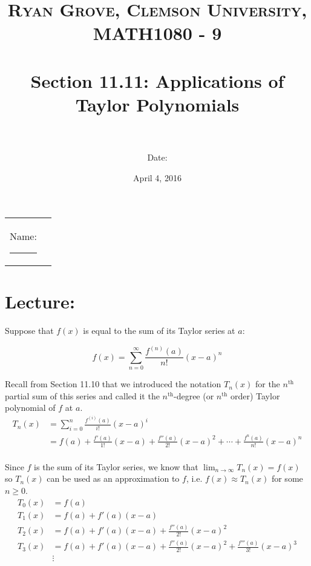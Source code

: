 \documentclass[paper=a4, fontsize=11pt]{scrartcl} %
\title{	
\normalfont \normalsize 
\textsc{Ryan Grove, Clemson University, MATH1080 - 9} \\ [25pt] %
\horrule{0.5pt} \\[0.4cm] %
\huge Section 11.11: Applications of Taylor Polynomials \\ %
\horrule{2pt} \\[0.5cm] %
}
\author{Date:} %
\date{\normalsize April 4, 2016} %
\numberwithin{equation}{section} %
\numberwithin{figure}{section} %
\numberwithin{table}{section} %
\newcommand{\ds}{\displaystyle}
\begin{document}
\maketitle %

\begin{flushleft}
\begin{tabular}{l l}
Name: \rule{3.2in}{.01cm}  & {}%
\end{tabular}
\end{flushleft}


\section*{\textbf{Lecture:}}

Suppose that $f(x)$ is equal to the sum of its Taylor series at $a$:

\[f(x) = \ds\sum_{n=0}^\infty \ds\frac{f^{(n)}(a)}{n!}(x-a)^n\]
\indent

Recall from Section 11.10 that we introduced the notation $T_n(x)$ for the $n^{\text{th}}$ partial sum of this series and called it the $n^{\text{th}}$-degree (or $n^{\text{th}}$ order) Taylor polynomial of $f$ at $a$.\\

\begin{align*}
T_n(x) &= \ds\sum_{i=0}^n \ds\frac{f^{(i)}(a)}{i!}(x-a)^i\\
&= f(a) + \ds\frac{f'(a)}{1!}(x-a) + \ds\frac{f''(a)}{2!}(x-a)^2 + \cdots + \ds\frac{f^{n}(a)}{n!} (x-a)^n\\
\end{align*}

Since $f$ is the sum of its Taylor series, we know that $\ds\lim_{n\to\infty} T_n(x)=f(x)$ so $T_n(x)$ can be used as an approximation to $f$, i.e. $f(x) \approx T_n(x)$ for some $n\geq 0$.\\

\begin{align*}
T_0(x) &= f(a)\\
T_1(x) &= f(a) + f'(a)(x-a)\\
T_2(x) &= f(a) + f'(a)(x-a) + \ds\frac{f''(a)}{2!}(x-a)^2\\
T_3(x) &= f(a) + f'(a)(x-a) + \ds\frac{f''(a)}{2!}(x-a)^2 + \ds\frac{f'''(a)}{3!}(x-a)^3\\
&\vdots\\
\end{align*}
\indent
\end{document}
